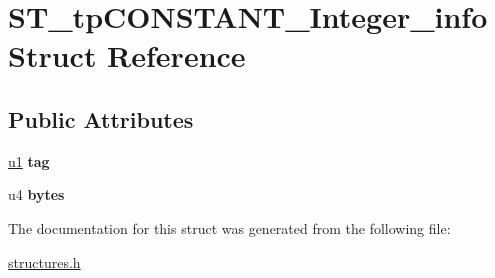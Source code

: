 \hypertarget{structST__tpCONSTANT__Integer__info}{}\section{S\+T\+\_\+tp\+C\+O\+N\+S\+T\+A\+N\+T\+\_\+\+Integer\+\_\+info Struct Reference}
\label{structST__tpCONSTANT__Integer__info}
\subsection*{Public Attributes}
\begin{DoxyCompactItemize}
\item 
\mbox{\label{structST__tpCONSTANT__Integer__info_a401f0b64b2b9e5a1feb51bf481893803}} 
\mbox{\hyperlink{structures_8h_ad9f4cdb6757615aae2fad89dab3c5470}{u1}} {\bfseries tag}
\item 
\mbox{\label{structST__tpCONSTANT__Integer__info_ab2ed3926470437ab82b9b1acc1333c8c}} 
u4 {\bfseries bytes}
\end{DoxyCompactItemize}


The documentation for this struct was generated from the following file\+:\begin{DoxyCompactItemize}
\item 
\mbox{\hyperlink{structures_8h}{structures.\+h}}\end{DoxyCompactItemize}
